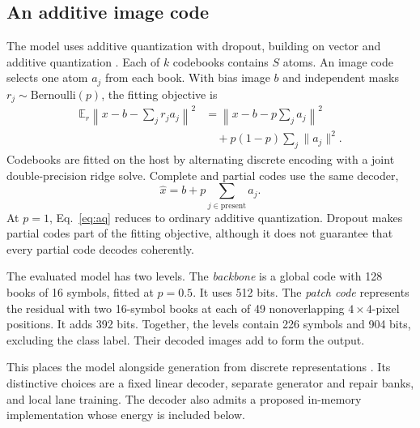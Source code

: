 \documentclass[reprint,amsmath,amssymb,aps,pra,floatfix,nofootinbib]{revtex4-2}
\begin{document}
\subsection{An additive image code}
The model uses additive quantization with dropout, building on vector and additive quantization \cite{gray1984vq,jegou2011product,babenko2014additive}. Each of $k$ codebooks contains $S$ atoms. An image code selects one atom $a_j$ from each book. With bias image $b$ and independent masks $r_j\sim\mathrm{Bernoulli}(p)$, the fitting objective is
\begin{align}
\mathbb E_r\left\|x-b-\sum_j r_j a_j\right\|^2
&=\left\|x-b-p\sum_j a_j\right\|^2 \nonumber\\
&\quad+p(1-p)\sum_j\|a_j\|^2.
\label{eq:aq}
\end{align}
Codebooks are fitted on the host by alternating discrete encoding with a joint double-precision ridge solve. Complete and partial codes use the same decoder,
\begin{equation}
\hat x=b+p\sum_{j\in\mathrm{present}}a_j.
\label{eq:decode}
\end{equation}
At $p=1$, Eq.~\eqref{eq:aq} reduces to ordinary additive quantization. Dropout makes partial codes part of the fitting objective, although it does not guarantee that every partial code decodes coherently.

The evaluated model has two levels. The \emph{backbone} is a global code with 128 books of 16 symbols, fitted at $p=0.5$. It uses 512 bits. The \emph{patch code} represents the residual with two 16-symbol books at each of 49 nonoverlapping $4\times4$-pixel positions. It adds 392 bits. Together, the levels contain 226 symbols and 904 bits, excluding the class label. Their decoded images add to form the output.

This places the model alongside generation from discrete representations \cite{vandenoord2017vqvae,chang2022maskgit}. Its distinctive choices are a fixed linear decoder, separate generator and repair banks, and local lane training. The decoder also admits a proposed in-memory implementation whose energy is included below.
\end{document}
